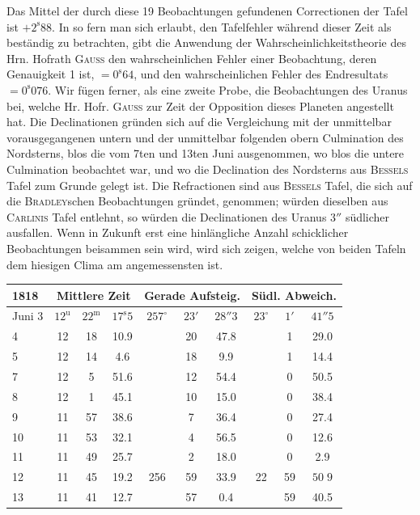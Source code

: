 \par\indent Das Mittel der durch diese 19 Beobachtungen gefundenen Correctionen der Tafel ist $+2^{\mathrm{s}}88$. In
so fern man sich erlaubt, den Tafelfehler während dieser Zeit als beständig zu betrachten, gibt die Anwendung
der Wahrscheinlichkeitstheorie des Hrn. Hofrath \textsc{Gauss} den wahrscheinlichen Fehler einer
Beobachtung, deren Genauigkeit 1 ist, $=0^{\mathrm{s}}64$, und den wahrscheinlichen Fehler des Endresultats
$=0^{\mathrm{s}}076$. Wir fügen ferner, als eine zweite Probe, die Beobachtungen des Uranus bei, welche Hr. Hofr.
\textsc{Gauss} zur Zeit der Opposition dieses Planeten angestellt hat. Die Declinationen gründen sich auf die
Vergleichung mit der unmittelbar vorausgegangenen untern und der unmittelbar folgenden obern Culmination
des Nordsterns, blos die vom 7ten und 13ten Juni ausgenommen, wo blos die untere Culmination
beobachtet war, und wo die Declination des Nordsterns aus \textsc{Bessels} Tafel zum Grunde gelegt
ist. Die Refractionen sind aus \textsc{Bessels} Tafel, die sich auf die \textsc{Bradley}schen Beobachtungen gründet,
genommen; würden dieselben aus \textsc{Carlinis} Tafel entlehnt, so würden die Declinationen des Uranus $3''$
südlicher ausfallen. Wenn in Zukunft erst eine hinlängliche Anzahl schicklicher Beobachtungen beisammen
sein wird, wird sich zeigen, welche von beiden Tafeln dem hiesigen Clima am angemessensten ist.

\begin{center}
\setlength{\tabcolsep}{3pt}
\begin{tabular}{l|ccc|ccc|ccc}
\hline
1818 & \multicolumn{3}{c|}{Mittlere Zeit} & \multicolumn{3}{c|}{Gerade Aufsteig.} & \multicolumn{3}{c}{Südl. Abweich.} \\
\hline
Juni 3 & $12^{\mathrm u}$ & $22^{\mathrm m}$ & $17^{\mathrm s}5$ & $257^\circ$ & $23'$ & $28''3$ & $23^\circ$ & $1'$ & $41''5$ \\
4 & 12 & 18 & 10.9 & & 20 & 47.8 & & 1 & 29.0 \\
5 & 12 & 14 & 4.6 & & 18 & 9.9 & & 1 & 14.4 \\
7 & 12 & 5 & 51.6 & & 12 & 54.4 & & 0 & 50.5 \\
8 & 12 & 1 & 45.1 & & 10 & 15.0 & & 0 & 38.4 \\
9 & 11 & 57 & 38.6 & & 7 & 36.4 & & 0 & 27.4 \\
10 & 11 & 53 & 32.1 & & 4 & 56.5 & & 0 & 12.6 \\
11 & 11 & 49 & 25.7 & & 2 & 18.0 & & 0 & 2.9 \\
12 & 11 & 45 & 19.2 & 256 & 59 & 33.9 & 22 & 59 & $50\;9$ \\ 
13 & 11 & 41 & 12.7 & & 57 & 0.4 & & 59 & 40.5 \\
\hline
\end{tabular}
\end{center}

